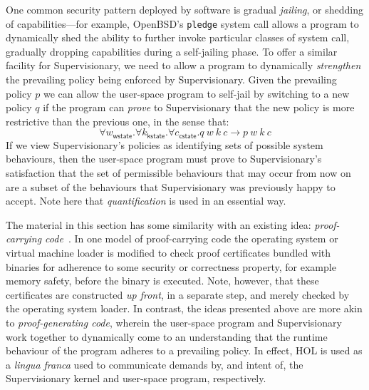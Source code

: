 \documentclass[a4paper, UKenglish, cleveref, autoref, thm-restate, colorlinks]{lipics-v2021}
\newcommand{\fall}[1]{\forall{#1}.}
\begin{document}
One common security pattern deployed by software is gradual \emph{jailing}, or shedding of capabilities---for example, OpenBSD's \texttt{pledge} system call allows a program to dynamically shed the ability to further invoke particular classes of system call, gradually dropping capabilities during a self-jailing phase.
To offer a similar facility for Supervisionary, we need to allow a program to dynamically \emph{strengthen} the prevailing policy being enforced by Supervisionary.
Given the prevailing policy $p$ we can allow the user-space program to self-jail by switching to a new policy $q$ if the program can \emph{prove} to Supervisionary that the new policy is more restrictive than the previous one, in the sense that:
\begin{displaymath}
\fall{w_{\mathsf{wstate}}}\fall{k_{\mathsf{kstate}}}\fall{c_{\mathsf{cstate}}}q\ w\ k\ c \longrightarrow p\ w\ k\ c
\end{displaymath}
If we view Supervisionary's policies as identifying sets of possible system behaviours, then the user-space program must prove to Supervisionary's satisfaction that the set of permissible behaviours that may occur from now on are a subset of the behaviours that Supervisionary was previously happy to accept.
Note here that \emph{quantification} is used in an essential way.

The material in this section has some similarity with an existing idea: \emph{proof-carrying code}~\cite{DBLP:reference/crypt/Necula11}.
In one model of proof-carrying code the operating system or virtual machine loader is modified to check proof certificates bundled with binaries for adherence to some security or correctness property, for example memory safety, before the binary is executed.
Note, however, that these certificates are constructed \emph{up front}, in a separate step, and merely checked by the operating system loader.
In contrast, the ideas presented above are more akin to \emph{proof-generating code}, wherein the user-space program and Supervisionary work together to dynamically come to an understanding that the runtime behaviour of the program adheres to a prevailing policy.
In effect, HOL is used as a \emph{lingua franca} used to communicate demands by, and intent of, the Supervisionary kernel and user-space program, respectively.
\end{document}
